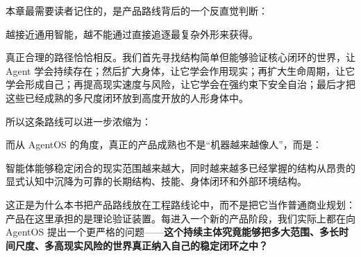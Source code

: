 本章最需要读者记住的，是产品路线背后的一个反直觉判断：

\begin{proposition*}
越接近通用智能，越不能通过直接追逐最复杂外形来获得。
\end{proposition*}

真正合理的路径恰恰相反。我们首先寻找结构简单但能够验证核心闭环的世界，让 Agent 学会持续存在；然后扩大身体，让它学会作用现实；再扩大生命周期，让它学会形成自己；再提高现实速度与风险，让它学会在强约束下安全自治；最后才把这些已经成熟的多尺度闭环放到高度开放的人形身体中。

所以这条路线可以进一步浓缩为：
\begin{statementbox}
\centering
{}
\end{statementbox}

而从 AgentOS 的角度，真正的产品成熟也不是“机器越来越像人”，而是：

\begin{statementbox}
智能体能够稳定闭合的现实范围越来越大，同时越来越多已经掌握的结构从昂贵的显式认知中沉降为可靠的长期结构、技能、身体闭环和外部环境结构。
\end{statementbox}

这正是为什么本书把产品路线放在工程路线论中，而不是把它当作普通商业规划：产品在这里承担的是理论验证装置。每进入一个新的产品阶段，我们实际上都在向 AgentOS 提出一个更严格的问题——\textbf{这个持续主体究竟能够把多大范围、多长时间尺度、多高现实风险的世界真正纳入自己的稳定闭环之中？}
